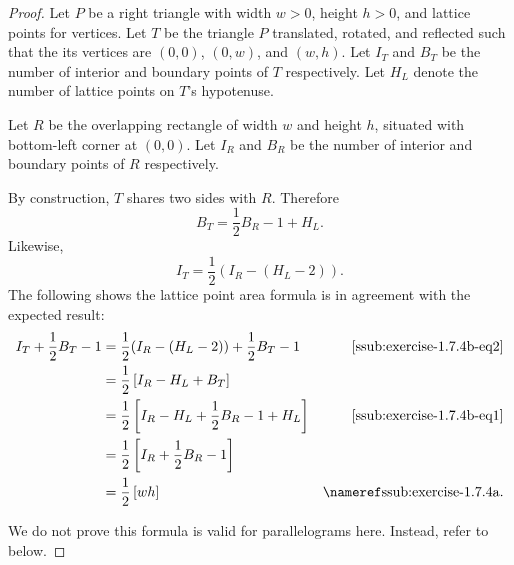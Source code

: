 \documentclass{report}
\begin{document}
\begin{proof}

  Let $P$ be a right triangle with width $w > 0$, height $h > 0$, and lattice
    points for vertices.
  Let $T$ be the triangle $P$ translated, rotated, and reflected such that the
    its vertices are $(0, 0)$, $(0, w)$, and $(w, h)$.
  Let $I_T$ and $B_T$ be the number of interior and boundary points of $T$
    respectively.
  Let $H_L$ denote the number of lattice points on $T$'s hypotenuse.

  Let $R$ be the overlapping rectangle of width $w$ and height $h$, situated
    with bottom-left corner at $(0, 0)$.
  Let $I_R$ and $B_R$ be the number of interior and boundary points
    of $R$ respectively.

  By construction, $T$ shares two sides with $R$.
  Therefore
    \begin{equation}
      \label{ssub:exercise-1.7.4b-eq1}
      B_T = \frac{1}{2}B_R - 1 + H_L.
    \end{equation}
  Likewise,
    \begin{equation}
      \label{ssub:exercise-1.7.4b-eq2}
      I_T = \frac{1}{2}(I_R - (H_L - 2)).
    \end{equation}
  The following shows the lattice point area formula is in agreement with
    the expected result:
    \begin{align*}
      I_T + \frac{1}{2}B_T - 1
        & = \frac{1}{2}(I_R - (H_L - 2)) + \frac{1}{2}B_T - 1
          & \eqref{ssub:exercise-1.7.4b-eq2} \\
        & = \frac{1}{2}\left[ I_R - H_L + B_T \right] \\
        & = \frac{1}{2}\left[ I_R - H_L + \frac{1}{2}B_R - 1 + H_L \right]
          & \eqref{ssub:exercise-1.7.4b-eq1} \\
        & = \frac{1}{2}\left[ I_R + \frac{1}{2}B_R - 1 \right] \\
        & = \frac{1}{2}\left[ wh \right] & \textref{ssub:exercise-1.7.4a}.
    \end{align*}

  We do not prove this formula is valid for parallelograms here.
  Instead, refer to  below.

\end{proof}

\subsubsection{}%
\label{ssub:exercise-1.7.4c}
\end{document}
